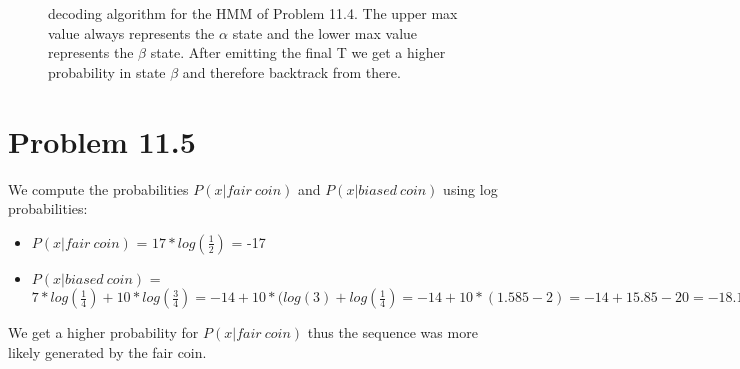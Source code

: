 \documentclass[a4paper]{article}
\begin{document}
\begin{center}
\begin{figure}[!htp]
{
}
\vspace{-3cm}
\caption{decoding algorithm for the HMM of Problem 11.4. The upper max value always represents the $\alpha$ state and the lower max value represents the $\beta$ state. After emitting the final T we get a higher probability in state  $\beta$ and therefore backtrack from there.}

\end{figure}

\end{center}

\section{Problem 11.5}

We compute the probabilities $P(x| fair\ coin)$ and $P(x| biased\ coin)$ using log probabilities:
\begin{itemize}
\item $P(x| fair\ coin)$ = $17*log(\frac{1}{2})$ = -17
\item $P(x| biased\ coin)$ = $7*log(\frac{1}{4})+10*log(\frac{3}{4}) = -14 + 10*(log(3)+log(\frac{1}{4}) = -14 + 10*(1.585-2) = -14 + 15.85-20 = -18.15$
\end{itemize}
We get a higher probability for $P(x| fair\ coin)$ thus the sequence was more likely generated by the fair 
coin.
\end{document}
